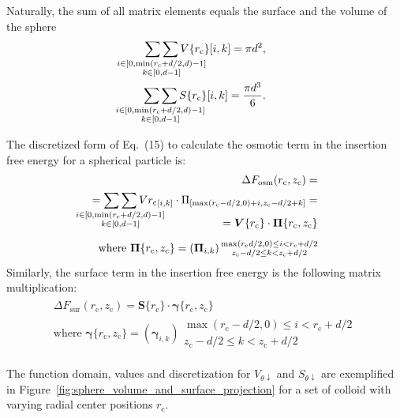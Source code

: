 \documentclass[10pt, a4paper, twocolumn]{article}
\begin{document}
Naturally, the sum of all matrix elements equals the surface and the volume of the sphere
\begin{eqnarray*}
    \mathop{\sum\sum}_{\mathclap{\substack{i \in [0, \min(r_{\text{c}}+d/2,d)-1] \\ k \in [0, d-1]}}}  V\{r_{\text{c}}\}{[i, k]} = \pi d^2,
    \\
    \mathop{\sum\sum}_{\mathclap{\substack{i \in [0, \min(r_{\text{c}}+d/2,d)-1] \\ k \in [0, d-1]}}}  S\{r_{\text{c}}\}{[i, k]} = \frac{\pi d^3}{6} .
\end{eqnarray*}

The discretized form of Eq.~(15) to calculate the osmotic term in the insertion free energy for a spherical particle is:
\begin{eqnarray}
    \begin{aligned}
        \Delta F_{\text{osm}}(r_{\text{c}}, z_{\text{c}}) =\\
        = \mathop{\sum\sum}_{\mathclap{\substack{i \in [0, \min(r_{\text{c}}+d/2,d)-1] \\ k \in [0, d-1]}}} V{r_{\text{c}}}_{[i, k]} \cdot \Pi_{[\max(r_{\text{c}}-d/2,0)+i, z_{\text{c}}-d/2+k]} =\\[-15pt]
        = \bm{V}\{r_{\text{c}}\} \cdot \bm{\Pi}\{r_{\text{c}}, z_{\text{c}}\} \\[5pt]
        \text{where } \bm{\Pi}\{r_{\text{c}},z_{\text{c}}\} =\left(\bm{\Pi}_{i,k}\right) {\substack{\max(r_{\text{c}}d/2,0) \le i < r_{\text{c}}+d/2 \\ z_{\text{c}}-d/2 \le k < z_{\text{c}}+d/2}}
    \end{aligned}
\end{eqnarray}
Similarly, the surface term in the insertion free energy is the following matrix multiplication:
\begin{eqnarray}
    \begin{aligned}
        \Delta F_{\text{sur}}(r_{\text{c}}, z_{\text{c}}) = \bm{S}\{r_{\text{c}}\} \cdot \bm{\gamma}\{r_{\text{c}}, z_{\text{c}}\} \\[5pt]
        \text{where } \bm{\gamma}\{r_{\text{c}},z_{\text{c}}\} =\left(\bm{\gamma}_{i,k}\right) {\substack{\max(r_{\text{c}}-d/2,0) \le i < r_{\text{c}}+d/2 \\ z_{\text{c}}-d/2 \le k < z_{\text{c}}+d/2}}
    \end{aligned}
\end{eqnarray}

The function domain, values and discretization for $V_{\theta \downarrow}$ and $S_{\theta \downarrow}$ are exemplified in Figure~\ref{fig:sphere_volume_and_surface_projection} for a set of colloid with varying radial center positions $r_{\text{c}}$.
\end{document}
